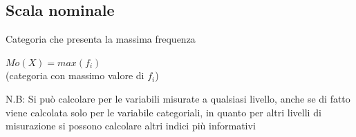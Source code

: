 \documentclass[compress]{beamer}
\begin{document}
\subsection*{Scala nominale}

\begin{frame}
	Categoria che presenta la massima frequenza
	
	\vspace{3mm}
	
	\begin{center}
		$Mo(X) = max(f_i)$ \\ (categoria con massimo valore di $f_i$)
	\end{center}
	
	
	\vspace{3mm}
	\begin{block}
		
		N.B: Si può calcolare per le variabili misurate a qualsiasi livello, anche se di fatto viene calcolata solo per le variabile categoriali, in quanto per altri livelli di misurazione si
		possono calcolare altri indici più informativi
	\end{block}
\end{frame}
\end{document}
